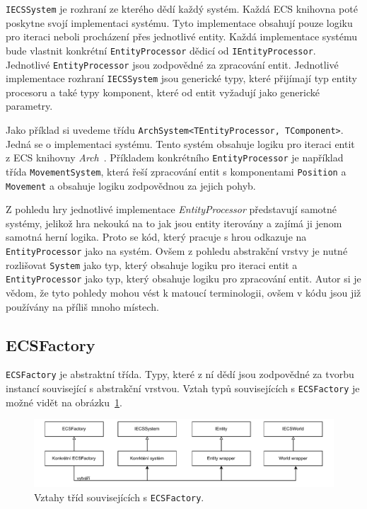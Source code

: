 \texttt{IECSSystem} je rozhraní ze kterého dědí každý systém. Každá ECS knihovna poté poskytne svojí implementaci systému. Tyto implementace obsahují pouze logiku pro iteraci neboli procházení přes jednotlivé entity. Každá implementace systému bude vlastnit konkrétní \texttt{EntityProcessor} dědicí od \texttt{IEntityProcessor}. Jednotlivé \texttt{EntityProcessor} jsou zodpovědné za zpracování entit. Jednotlivé implementace rozhraní \texttt{IECSSystem} jsou generické typy, které přijímají typ entity procesoru a také typy komponent, které od entit vyžadují jako generické parametry.

Jako příklad si uvedeme třídu \texttt{ArchSystem<TEntityProcessor, TComponent>}. Jedná se o implementaci systému. Tento systém obsahuje logiku pro iteraci entit z ECS knihovny \textit{Arch}~\cite{Arch}. Příkladem konkrétního \texttt{EntityProcessor} je například třída \texttt{MovementSystem}, která řeší zpracování entit s komponentami \texttt{Position} a \texttt{Movement} a obsahuje logiku zodpovědnou za jejich pohyb.

Z pohledu hry jednotlivé implementace \textit{EntityProcessor} představují samotné systémy, jelikož hra nekouká na to jak jsou entity iterovány a zajímá ji jenom samotná herní logika. Proto se kód, který pracuje s hrou odkazuje na \texttt{EntityProcessor} jako na systém. Ovšem z pohledu abstrakční vrstvy je nutné rozlišovat \texttt{System} jako typ, který obsahuje logiku pro iteraci entit a \texttt{EntityProcessor} jako typ, který obsahuje logiku pro zpracování entit. Autor si je vědom, že tyto pohledy mohou vést k matoucí terminologii, ovšem v kódu jsou již používány na příliš mnoho místech.

\subsection{ECSFactory}
\texttt{ECSFactory} je abstraktní třída. Typy, které z ní dědí jsou zodpovědné za tvorbu instancí související s abstrakční vrstvou. Vztah typů souvisejících s \texttt{ECSFactory} je možné vidět na obrázku~\ref{fig:abstract-layer-ecsfactory}.

\begin{figure}[!htb]
  \centering
  \includegraphics[width=1.0\linewidth]{img/abstract-layer-ecsfactory.pdf}
  \caption{Vztahy tříd souvisejících s \texttt{ECSFactory}.}
  \label{fig:abstract-layer-ecsfactory}
\end{figure}

